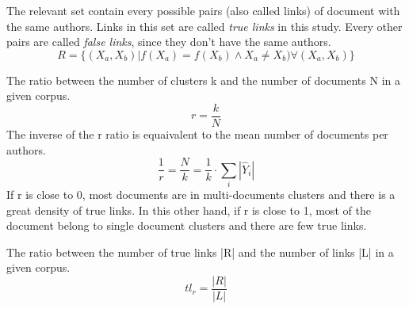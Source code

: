 \begin{definition}
  The relevant set contain every possible pairs (also called links) of document with the same authors. Links in this set are called \textit{true links} in this study. Every other pairs are called \textit{false links}, since they don't have the same authors.
  \begin{equation}
    \label{def:relevant_set}
    R = \{(X_a, X_b) | f(X_a) = f(X_b) \land X_a \neq X_b) \forall (X_a, X_b)\}
  \end{equation}
\end{definition}

\begin{definition}
  The ratio between the number of clusters k and the number of documents N in a given corpus.
  \begin{equation}
    r = \frac{k}{N}
  \end{equation}
  The inverse of the r ratio is equaivalent to the mean number of documents per authors.
  \begin{equation}
    \frac{1}{r} = \frac{N}{k} = \frac{1}{k} \cdot \sum_{i} |\hat{Y}_i|
  \end{equation}
  If r is close to 0, most documents are in multi-documents clusters and there is a great density of true links.
  In this other hand, if r is close to 1, most of the document belong to single document clusters and there are few true links.
\end{definition}

\begin{definition}
  The ratio between the number of true links |R| and the number of links |L| in a given corpus.
  \begin{equation}
    tl_r = \frac{|R|}{|L|}
  \end{equation}
\end{definition}
